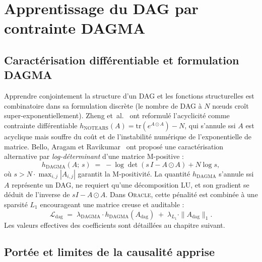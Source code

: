 \documentclass[14pt,a4paper,openany]{extreport}
\theoremstyle{definition}
\newcommand{\Oracle}{\textsc{Oracle}}
\newcommand{\Adag}{\ensuremath{A_{\mathrm{dag}}}}
\begin{document}
\section{Apprentissage du DAG par contrainte DAGMA}
\label{sec:oracle-dagma}

\subsection{Caractérisation différentiable et formulation DAGMA}
\label{ssec:oracle-dag-problem}

Apprendre conjointement la structure d'un DAG et les fonctions structurelles est combinatoire dans sa formulation discrète (le nombre de DAG à $N$ nœuds croît super-exponentiellement). Zheng et~al.~\cite{zheng_notears_2018} ont reformulé l'acyclicité comme contrainte différentiable $h_{\mathrm{NOTEARS}}(A) = \mathrm{tr}(e^{A \odot A}) - N$, qui s'annule ssi $A$ est acyclique mais souffre du coût et de l'instabilité numérique de l'exponentielle de matrice. Bello, Aragam et Ravikumar~\cite{bello_dagma_2022} ont proposé une caractérisation alternative par \emph{log-déterminant} d'une matrice M-positive :
\begin{equation}
  h_{\mathrm{DAGMA}}(A;\, s) \;=\; -\log \det\!\left( s\,I - A \odot A \right) + N \log s,
  \label{eq:dagma}
\end{equation}
où $s > N \cdot \max_{i,j} |A_{i,j}|$ garantit la M-positivité. La quantité $h_{\mathrm{DAGMA}}$ s'annule ssi $A$ représente un DAG, ne requiert qu'une décomposition LU, et son gradient se déduit de l'inverse de $sI - A \odot A$. Dans \Oracle{}, cette pénalité est combinée à une sparsité $L_1$ encourageant une matrice creuse et auditable :
\begin{equation}
  \mathcal{L}_{\mathrm{dag}} \;=\; \lambda_{\mathrm{DAGMA}} \cdot h_{\mathrm{DAGMA}}(\Adag) \;+\; \lambda_{L_1} \cdot \|\Adag\|_1.
  \label{eq:loss-dag}
\end{equation}
Les valeurs effectives des coefficients sont détaillées au chapitre suivant.

\subsection{Portée et limites de la causalité apprise}
\label{ssec:oracle-causal-limits}
\end{document}
